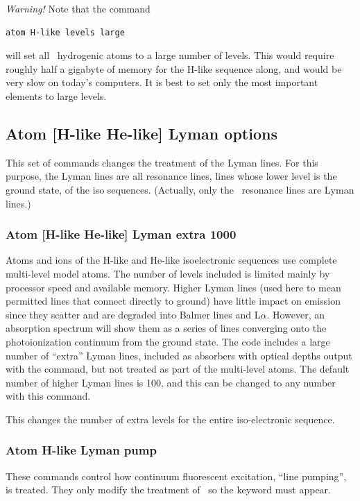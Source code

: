 \emph{Warning!}  Note that the command
\begin{verbatim}
atom H-like levels large
\end{verbatim}
will set all \LIMELM\ hydrogenic atoms to a large number of levels.
This would
require roughly half a gigabyte of memory for the H-like sequence along,
and would be very slow on today's computers.
It is best to set only the
most important elements to large levels.

\subsection{Atom [H-like \OR{} He-like] Lyman options}

This set of commands changes the treatment of the Lyman lines.
For this purpose, the Lyman lines are all resonance lines,
lines whose lower level is the ground state,  of the  iso sequences.
(Actually, only the \hi\ resonance lines are Lyman lines.)

\subsubsection{Atom [H-like \OR{} He-like]  Lyman extra 1000}  

Atoms and ions of the H-like and He-like
isoelectronic sequences use complete multi-level model atoms.
The number of levels included is limited mainly by processor speed and
available memory.
Higher Lyman lines (used here to mean permitted lines that connect directly
to ground) have little impact on emission since they
scatter and are degraded
into Balmer lines and L$\alpha $.
However, an absorption spectrum will show them
as a series of lines converging onto the photoionization continuum from
the ground state.
The code includes a large number of ``extra'' Lyman lines,
included as absorbers with optical depths output with
the  command,
but not treated as part of the multi-level atoms.
The default number of higher Lyman lines is 100, and
this can be changed to any number with this command.

This changes the number of extra levels for the entire iso-electronic sequence.

\subsubsection{Atom H-like Lyman pump}  

These commands control how continuum fluorescent excitation, ``line pumping'', is treated.
They only modify the treatment of \hi\ so the  keyword must appear.


